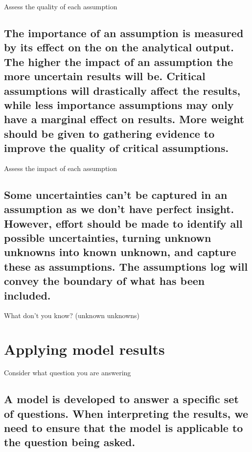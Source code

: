 \documentclass[]{book}
\begin{document}
 Assess the quality of each assumption

\subsection{The importance of an assumption is measured by its effect on
the on the analytical output. The higher the impact of an assumption the
more uncertain results will be. Critical assumptions will drastically
affect the results, while less importance assumptions may only have a
marginal effect on results. More weight should be given to gathering
evidence to improve the quality of critical
assumptions.}\label{the-importance-of-an-assumption-is-measured-by-its-effect-on-the-on-the-analytical-output.-the-higher-the-impact-of-an-assumption-the-more-uncertain-results-will-be.-critical-assumptions-will-drastically-affect-the-results-while-less-importance-assumptions-may-only-have-a-marginal-effect-on-results.-more-weight-should-be-given-to-gathering-evidence-to-improve-the-quality-of-critical-assumptions.}

 Assess the impact of each assumption

\subsection{Some uncertainties can't be captured in an assumption as we
don't have perfect insight. However, effort should be made to identify
all possible uncertainties, turning unknown unknowns into known unknown,
and capture these as assumptions. The assumptions log will convey the
boundary of what has been
included.}\label{some-uncertainties-cant-be-captured-in-an-assumption-as-we-dont-have-perfect-insight.-however-effort-should-be-made-to-identify-all-possible-uncertainties-turning-unknown-unknowns-into-known-unknown-and-capture-these-as-assumptions.-the-assumptions-log-will-convey-the-boundary-of-what-has-been-included.}

 What don't you know? (unknown unknowns)

\section{Applying model results}\label{applying-model-results}

 Consider what question you are answering

\subsection{A model is developed to answer a specific set of questions.
When interpreting the results, we need to ensure that the model is
applicable to the question being
asked.}\label{a-model-is-developed-to-answer-a-specific-set-of-questions.-when-interpreting-the-results-we-need-to-ensure-that-the-model-is-applicable-to-the-question-being-asked.}
\end{document}
